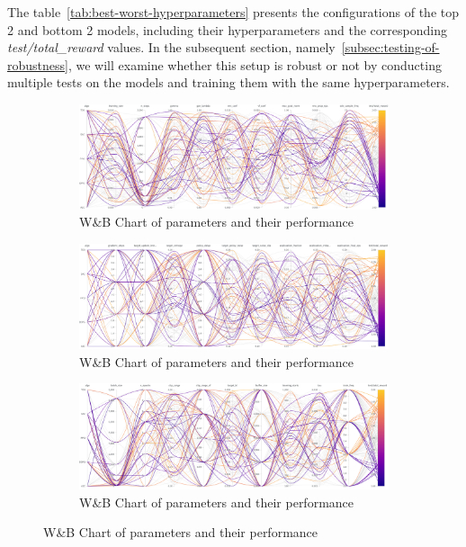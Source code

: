 \documentclass[../xlapes02]{subfiles}
\begin{document}
    The table~\cref{tab:best-worst-hyperparameters} presents the configurations of the top 2 and bottom 2 models, including their hyperparameters and the corresponding \emph{test/total\_reward} values. In the subsequent section, namely~\cref{subsec:testing-of-robustness}, we will examine whether this setup is robust or not by conducting multiple tests on the models and training them with the same hyperparameters.



    \begin{figure}
        \begin{subfigure}[t]{\textwidth}
            \centering
            \includegraphics[width=\linewidth]{image/wandb/wb1}
            \caption{W\&B Chart of parameters and their performance}
            \label{fig:wb-chart1}
        \end{subfigure}

        \vspace{0.5cm}

        \begin{subfigure}[t]{\textwidth}
            \centering
            \includegraphics[width=\linewidth]{image/wandb/wb2}
            \caption{W\&B Chart of parameters and their performance}
            \label{fig:wb-chart2}
        \end{subfigure}

        \vspace{0.5cm}

        \begin{subfigure}[t]{\textwidth}
            \centering
            \includegraphics[width=\linewidth]{image/wandb/wb3}
            \caption{W\&B Chart of parameters and their performance}
            \label{fig:wb-chart3}
        \end{subfigure}


\end{figure}
\end{document}
